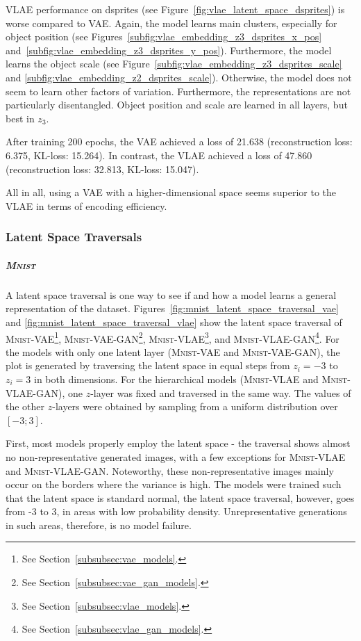 \ac{VLAE} performance on dsprites (see Figure~\ref{fig:vlae_latent_space_dsprites}) is worse compared to \ac{VAE}.
Again, the model learns main clusters, especially for object position (see Figures~\ref{subfig:vlae_embedding_z3_dsprites_x_pos} and~\ref{subfig:vlae_embedding_z3_dsprites_y_pos}).
Furthermore, the model learns the object scale (see Figure~\ref{subfig:vlae_embedding_z3_dsprites_scale} and \ref{subfig:vlae_embedding_z2_dsprites_scale}).
Otherwise, the model does not seem to learn other factors of variation.
Furthermore, the representations are not particularly disentangled.
Object position and scale are learned in all layers, but best in $z_3$.

After training 200 epochs, the \ac{VAE} achieved a loss of 21.638 (reconstruction loss: 6.375, \ac{KL}-loss: 15.264).
In contrast, the \ac{VLAE} achieved a loss of 47.860 (reconstruction loss: 32.813, \ac{KL}-loss: 15.047).

All in all, using a \ac{VAE} with a higher-dimensional space seems superior to the \ac{VLAE} in terms of encoding efficiency.

\subsubsection{Latent Space Traversals}\label{subsubsec:latent_space_traversals}

\subparagraph{\textsc{Mnist}}

A latent space traversal is one way to see if and how a model learns a general representation of the dataset.
Figures~\ref{fig:mnist_latent_space_traversal_vae} and \ref{fig:mnist_latent_space_traversal_vlae} show the latent space traversal of \textsc{Mnist}-\ac{VAE}\footnote{See Section~\ref{subsubsec:vae_models}.}, \textsc{Mnist}-\ac{VAE}-\ac{GAN}\footnote{See Section~\ref{subsubsec:vae_gan_models}.}, \textsc{Mnist}-\ac{VLAE}\footnote{See Section~\ref{subsubsec:vlae_models}.}, and \textsc{Mnist}-\ac{VLAE}-\ac{GAN}\footnote{See Section~\ref{subsubsec:vlae_gan_models}.}.
For the models with only one latent layer (\textsc{Mnist}-\ac{VAE} and \textsc{Mnist}-\ac{VAE}-\ac{GAN}), the plot is generated by traversing the latent space in equal steps from $z_i = -3$ to $z_i = 3$ in both dimensions.
For the hierarchical models (\textsc{Mnist}-\ac{VLAE} and \textsc{Mnist}-\ac{VLAE}-\ac{GAN}), one $z$-layer was fixed and traversed in the same way.
The values of the other $z$-layers were obtained by sampling from a uniform distribution over $[-3; 3]$.

First, most models properly employ the latent space - the traversal shows almost no non-representative generated images, with a few exceptions for \textsc{Mnist}-\ac{VLAE} and \textsc{Mnist}-\ac{VLAE}-\ac{GAN}.
Noteworthy, these non-representative images mainly occur on the borders where the variance is high.
The models were trained such that the latent space is standard normal, the latent space traversal, however, goes from -3 to 3, in areas with low probability density.
Unrepresentative generations in such areas, therefore, is no model failure.

